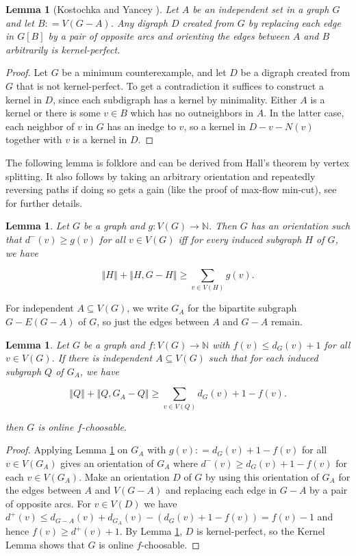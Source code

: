 \documentclass[12pt]{article}
\theoremstyle{plain}
\newtheorem{lem}[thm]{Lemma}
\theoremstyle{definition}
\theoremstyle{remark}
\newcommand{\IN}{\mathbb{N}}
\newcommand{\size}[1]{\left\Vert#1\right\Vert}
\newcommand{\func}[3]{#1\colon #2 \rightarrow #3}
\newcommand{\DefinedAs}{\mathrel{\mathop:}=}
\begin{document}
\begin{lem}[Kostochka and Yancey \cite{kostochkayancey2012ore}]\label{KernelPerfect}
	Let $A$ be an independent set in a graph $G$ and let $B \DefinedAs V(G - A)$. 
	Any digraph $D$ created from $G$ by replacing each edge in $G[B]$ by a pair of
	opposite arcs and orienting the edges between $A$ and $B$ arbitrarily is
	kernel-perfect.
\end{lem}
\begin{proof}
	Let $G$ be a minimum counterexample, and let $D$ be a digraph created from $G$
	that is not kernel-perfect.  To get a contradiction it suffices to construct a
	kernel in $D$, since each subdigraph has a kernel by minimality.  Either $A$ is
	a kernel or there is some $v \in B$ which has no outneighbors in $A$.  In the
	latter case, each neighbor of $v$ in $G$ has an inedge to $v$, so a kernel in
	$D - v - N(v)$ together with $v$ is a kernel in $D$.
\end{proof}

The following lemma is folklore and can be derived from Hall's theorem by vertex splitting. It also follows by taking an arbitrary orientation and repeatedly reversing paths if doing so gets a gain (like the proof of max-flow min-cut), see \cite{orevizing} for further details.

\begin{lem}\label{InOrientations}
	Let $G$ be a graph and $\func{g}{V(G)}{\IN}$.  Then $G$ has an orientation such that $d^-(v) \ge g(v)$ for all $v \in V(G)$ iff for every induced subgraph $H$ of $G$, we have
	
	\[\size{H} + \size{H,G-H} \ge \sum_{v \in V(H)} g(v).\]
\end{lem}

For independent $A \subseteq V(G)$, we write $G_A$ for the bipartite subgraph $G - E(G-A)$ of $G$, so just the edges between $A$ and $G-A$ remain.

\begin{lem}\label{MicStrength}
	Let $G$ be a graph and $\func{f}{V(G)}{\IN}$ with $f(v) \le d_G(v) + 1$ for all $v \in V(G)$.  If there is independent $A \subseteq V(G)$ such that for each induced subgraph $Q$ of $G_A$, we have
	
	\[\size{Q} + \size{Q, G_A - Q}  \ge  \sum_{v \in V(Q)} d_G(v) + 1 - f(v).\]
	
	\noindent then $G$ is online $f$-choosable.
\end{lem}
\begin{proof}
	Applying Lemma \ref{InOrientations} on $G_A$ with $g(v) \DefinedAs d_G(v) + 1 - f(v)$ for all $v \in V(G_A)$ gives an orientation of $G_A$ where $d^-(v) \ge d_G(v) + 1 - f(v)$ for each $v \in V(G_A)$.  Make an orientation $D$ of $G$ by using this orientation of $G_A$ for the edges between $A$ and $V(G-A)$ and replacing each edge in $G-A$ by a pair of opposite arcs.  For $v \in V(D)$ we have $d^+(v) \le d_{G-A}(v) + d_{G_A}(v) - (d_G(v) + 1 - f(v)) = f(v) - 1$ and hence $f(v) \ge d^+(v) + 1$.  By Lemma \ref{KernelPerfect}, $D$ is kernel-perfect, so the Kernel Lemma shows that $G$ is online $f$-choosable.
\end{proof}
\end{document}
